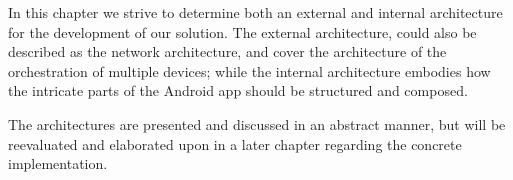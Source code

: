 In this chapter we strive to determine both an external and internal architecture for the development of our solution.
The external architecture, could also be described as the network architecture, and cover the architecture of the orchestration of multiple devices;
while the internal architecture embodies how the intricate parts of the Android app should be structured and composed.

The architectures are presented and discussed in an abstract manner,
but will be reevaluated and elaborated upon in a later chapter regarding the concrete implementation.

